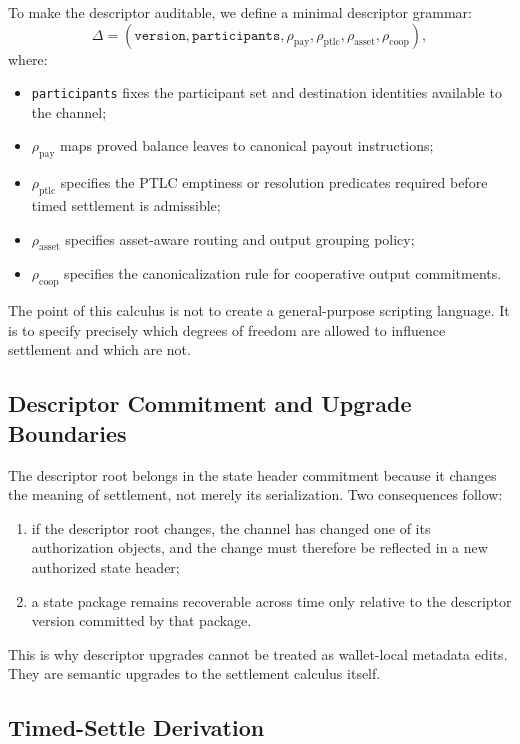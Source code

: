 \documentclass[11pt,a4paper]{article}
\begin{document}
To make the descriptor auditable, we define a minimal descriptor grammar:
\[
\Delta = (\texttt{version}, \texttt{participants}, \rho_{\mathrm{pay}}, \rho_{\mathrm{ptlc}}, \rho_{\mathrm{asset}}, \rho_{\mathrm{coop}}),
\]
where:
\begin{itemize}
    \item \texttt{participants} fixes the participant set and destination identities available to the channel;
    \item $\rho_{\mathrm{pay}}$ maps proved balance leaves to canonical payout instructions;
    \item $\rho_{\mathrm{ptlc}}$ specifies the PTLC emptiness or resolution predicates required before timed settlement is admissible;
    \item $\rho_{\mathrm{asset}}$ specifies asset-aware routing and output grouping policy;
    \item $\rho_{\mathrm{coop}}$ specifies the canonicalization rule for cooperative output commitments.
\end{itemize}

The point of this calculus is not to create a general-purpose scripting language. It is to specify precisely which degrees of freedom are allowed to influence settlement and which are not.

\subsection{Descriptor Commitment and Upgrade Boundaries}

The descriptor root belongs in the state header commitment because it changes the meaning of settlement, not merely its serialization. Two consequences follow:
\begin{enumerate}
    \item if the descriptor root changes, the channel has changed one of its authorization objects, and the change must therefore be reflected in a new authorized state header;
    \item a state package remains recoverable across time only relative to the descriptor version committed by that package.
\end{enumerate}

This is why descriptor upgrades cannot be treated as wallet-local metadata edits. They are semantic upgrades to the settlement calculus itself.

\subsection{Timed-Settle Derivation}
\end{document}
